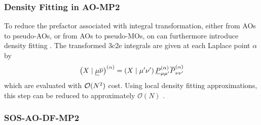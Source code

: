 
\subsubsection{Density Fitting in AO-MP2}

To reduce the prefactor associated with integral transformation, either from AOs to pseudo-AOs, or from AOs to pseudo-MOs, on can furthermore introduce density fitting \cite{Zie2009,Mau2014}. The transformed 3c2e integrals are given at each Laplace point $\alpha$ by
\begin{equation}
\left( X \mid \underline{\mu}\overline{\nu} \right)^{(\alpha)} = \left( X \mid \mu'\nu' \right) \underline{P}^{(\alpha)}_{\mu\mu'} \overline{P}^{(\alpha)}_{\nu\nu'}  
\end{equation}
\noindent which are evaluated with $\mathcal{O}(N^{2})$ cost. Using local density fitting approximations, this step can be reduced to approximately $\mathcal{O}(N)$ \cite{Gla2020}.

\subsubsection{SOS-AO-DF-MP2}

